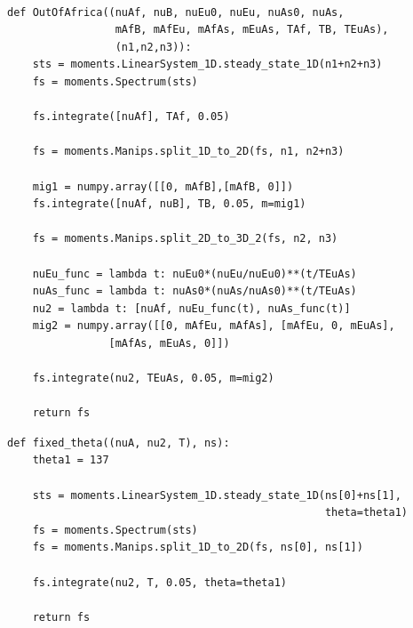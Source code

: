 \documentclass[12pt]{article}
\makeatletter
\newcommand{\py}[1]{\lstinline[breaklines=true,language=Python, showstringspaces=False]@#1@}
\makeatother
\begin{document}
\begin{lstlisting}[caption={\textbf{Out-of-Africa model from Gutenkunst (2009):} This model involves a size change in the ancestral population, a split, another split, and then exponential growth of populations 1 and 2.}, float,label={lst:OOA}]

def OutOfAfrica((nuAf, nuB, nuEu0, nuEu, nuAs0, nuAs, 
                 mAfB, mAfEu, mAfAs, mEuAs, TAf, TB, TEuAs),
                 (n1,n2,n3)):
    sts = moments.LinearSystem_1D.steady_state_1D(n1+n2+n3)
    fs = moments.Spectrum(sts)

    fs.integrate([nuAf], TAf, 0.05)
    
    fs = moments.Manips.split_1D_to_2D(fs, n1, n2+n3)
    
    mig1 = numpy.array([[0, mAfB],[mAfB, 0]])
    fs.integrate([nuAf, nuB], TB, 0.05, m=mig1)
    
    fs = moments.Manips.split_2D_to_3D_2(fs, n2, n3)

    nuEu_func = lambda t: nuEu0*(nuEu/nuEu0)**(t/TEuAs)
    nuAs_func = lambda t: nuAs0*(nuAs/nuAs0)**(t/TEuAs)
    nu2 = lambda t: [nuAf, nuEu_func(t), nuAs_func(t)]
    mig2 = numpy.array([[0, mAfEu, mAfAs], [mAfEu, 0, mEuAs],
    			[mAfAs, mEuAs, 0]])
    
    fs.integrate(nu2, TEuAs, 0.05, m=mig2)
                                
    return fs
\end{lstlisting}

\begin{lstlisting}[caption={\textbf{Fixed $\boldsymbol{\theta}$:} A split demographic model function with a fixed value of $\theta$=137 for derived population 1. The free parameters are the sizes of the ancestral pop, \py{nuA}, and derived pop 2, \py{nu2}, (relative to derived pop 1), along with the divergence time \py{T} between the two derived pops.}, label={lst:fixed_theta}, float]
def fixed_theta((nuA, nu2, T), ns):
    theta1 = 137
    
    sts = moments.LinearSystem_1D.steady_state_1D(ns[0]+ns[1],
                                                  theta=theta1)
    fs = moments.Spectrum(sts)
    fs = moments.Manips.split_1D_to_2D(fs, ns[0], ns[1])
                                
    fs.integrate(nu2, T, 0.05, theta=theta1)

    return fs
\end{lstlisting}

\clearpage
\end{document}
